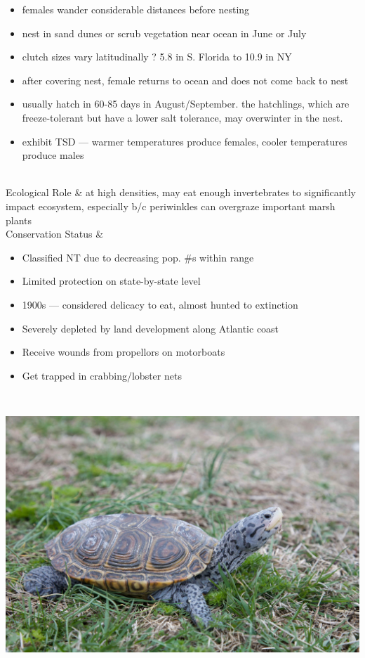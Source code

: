 \begin{center}
\begin{longtabu}
	\begin{itemize}[noitemsep]
		\item females wander considerable distances before nesting
		\item nest in sand dunes or scrub vegetation near ocean in June or July
		\item clutch sizes vary latitudinally ? 5.8 in S. Florida to 10.9 in NY
		\item after covering nest, female returns to ocean and does not come back to nest
		\item usually hatch in 60-85 days in August/September. the hatchlings, which are freeze-tolerant but have a lower salt tolerance, may overwinter in the nest.
		\item exhibit TSD --- warmer temperatures produce females, cooler temperatures produce males
	\end{itemize}
	\\
	\hline
	Ecological Role &
	at high densities, may eat enough invertebrates to significantly impact ecosystem, especially b/c periwinkles can overgraze important marsh plants
	\\
	\hline
	Conservation Status & 
	\begin{itemize}[noitemsep]
		\item Classified NT due to decreasing pop. \#s within range
		\item Limited protection on state-by-state level
		\item 1900s --- considered delicacy to eat, almost hunted to extinction
		\item Severely depleted by land development along Atlantic coast
		\item Receive wounds from propellors on motorboats
		\item Get trapped in crabbing/lobster nets
	\end{itemize}
	\\
	\hline
\end{longtabu}
\includegraphics[scale=0.075]{testudines/emydidae/malaclemys/1}

\end{center}
